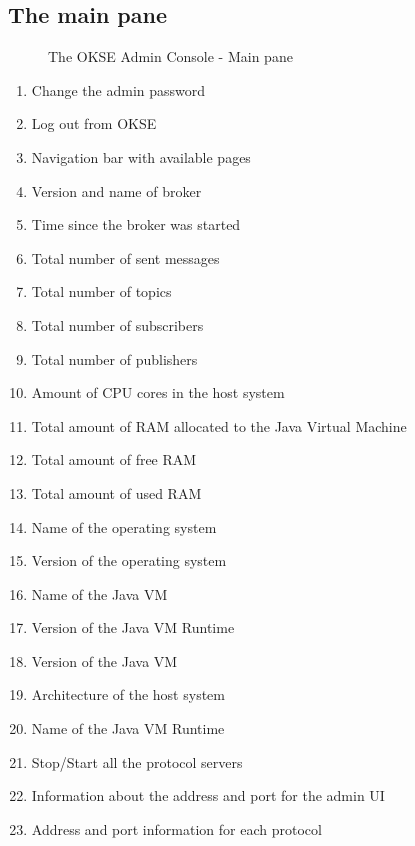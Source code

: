 \subsection{The main pane}
\begin{center}
  \begin{figure}[ht!]
    \caption{The OKSE Admin Console - Main pane} 
    \label{fig:OKSE Admin Console - Main pane}
  \end{figure}
\end{center}
\begin{enumerate}
\item Change the admin password
\item Log out from OKSE
\item Navigation bar with available pages
\item Version and name of broker
\item Time since the broker was started
\item Total number of sent messages
\item Total number of topics
\item Total number of subscribers
\item Total number of publishers
\item Amount of CPU cores in the host system
\item Total amount of RAM allocated to the Java Virtual Machine
\item Total amount of free RAM
\item Total amount of used RAM
\item Name of the operating system
\item Version of the operating system
\item Name of the Java VM
\item Version of the Java VM Runtime
\item Version of the Java VM
\item Architecture of the host system
\item Name of the Java VM Runtime
\item Stop/Start all the protocol servers
\item Information about the address and port for the admin UI
\item Address and port information for each protocol
\end{enumerate}


